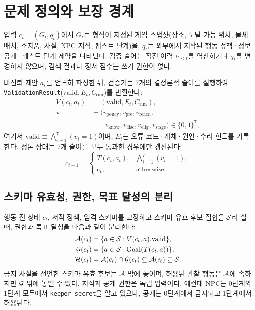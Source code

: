 \section{문제 정의와 보장 경계}\label{sec:problem}
입력 $c_t=(G_t,q_t)$에서 $G_t$는 형식이 지정된 게임 스냅샷(장소, 도달 가능 위치, 물체 배치, 소지품, 사실, NPC 지식, 퀘스트 단계)을, $q_t$는 외부에서 저작된 행동 정책·정보 공개·퀘스트 단계 제약을 나타낸다. 검증 술어는 직전 이력 $h_{<t}$를 역산하거나 $q_t$를 변경하지 않으며, 검색 결과나 정서 점수는 쓰기 권한이 없다.

비신뢰 제안 $a_t$를 엄격히 파싱한 뒤, 검증기는 7개의 결정론적 술어를 실행하여 \texttt{ValidationResult}(\allowbreak$\mathrm{valid},E_t,C_{\mathrm{run}}$)를 반환한다:
\begin{equation}
\begin{aligned}
V(c_t,a_t)&=(\mathrm{valid},E_t,C_{\mathrm{run}}),\\
\boldsymbol{v}&=(v_{\mathrm{policy}},v_{\mathrm{pre}},v_{\mathrm{reach}},\\
&\qquad v_{\mathrm{know}},v_{\mathrm{disc}},v_{\mathrm{elig}},v_{\mathrm{stage}})\in\{0,1\}^{7},
\end{aligned}
\end{equation}
여기서 $\mathrm{valid}\equiv\bigwedge_{i=1}^{7}(v_i=1)$이며, $E_t$는 오류 코드·개체·원인·수리 힌트를 기록한다. 정본 상태는 7개 술어를 모두 통과한 경우에만 갱신된다:
\begin{equation}
c_{t+1}=\begin{cases}
T(c_t,a_t), & \bigwedge_{i=1}^{7}(v_i=1),\\
c_t, & \text{otherwise.}
\end{cases}
\label{eq:transition}
\end{equation}

\subsection{스키마 유효성, 권한, 목표 달성의 분리}\label{sec:authorization-sets}
행동 전 상태 $c_t$, 저작 정책, 엄격 스키마를 고정하고 스키마 유효 후보 집합을 $\mathcal{S}$라 할 때, 권한과 목표 달성을 다음과 같이 분리한다:
\begin{equation}
\begin{aligned}
\mathcal{A}(c_t)&=\{a\in\mathcal{S}:V(c_t,a).\mathrm{valid}\},\\
\mathcal{G}(c_t)&=\{a\in\mathcal{S}:\operatorname{Goal}(T(c_t,a))\},\\
\mathcal{H}(c_t)&=\mathcal{A}(c_t)\cap\mathcal{G}(c_t)\subseteq\mathcal{A}(c_t)\subseteq\mathcal{S}.
\end{aligned}
\end{equation}
금지 사실을 선언한 스키마 유효 후보는 $\mathcal{A}$ 밖에 놓이며, 허용된 관찰 행동은 $\mathcal{A}$에 속하지만 $\mathcal{G}$ 밖에 놓일 수 있다. 지식과 공개 권한은 독립 입력이다. 예컨대 NPC는 0단계와 1단계 모두에서 \texttt{keeper\_\allowbreak secret}을 알고 있으나, 공개는 0단계에서 금지되고 1단계에서 허용된다.

